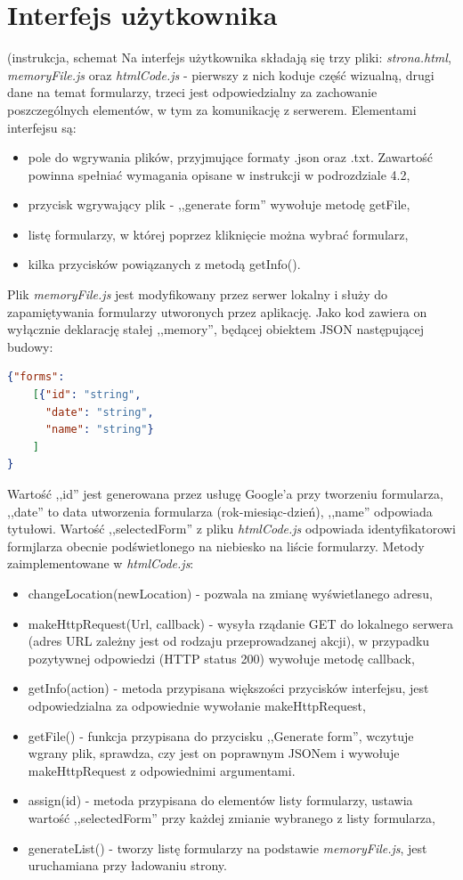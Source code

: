 \section{Interfejs użytkownika} (instrukcja, schemat
Na interfejs użytkownika składają się trzy pliki: \textit{strona.html}, \textit{memoryFile.js} oraz \textit{htmlCode.js} - pierwszy z nich koduje część wizualną, drugi dane na temat formularzy, trzeci jest odpowiedzialny za zachowanie poszczególnych elementów, w tym za komunikację z serwerem. 
\ind Elementami interfejsu są:
\begin{itemize}
\item pole do wgrywania plików, przyjmujące formaty .json oraz .txt. Zawartość powinna spełniać wymagania opisane w instrukcji w podrozdziale 4.2, %
\item przycisk wgrywający plik - ,,generate form'' wywołuje metodę getFile,
\item listę formularzy, w której poprzez kliknięcie można wybrać formularz,
\item kilka przycisków powiązanych z metodą getInfo().
\end{itemize}
\ind Plik \textit{memoryFile.js} jest modyfikowany przez serwer lokalny i służy do zapamiętywania formularzy utworonych przez aplikację. Jako kod zawiera on wyłącznie deklarację stałej ,,memory'', będącej obiektem JSON następującej budowy:
\begin{lstlisting}[language=json,firstnumber=1]
{"forms":
    [{"id": "string",
      "date": "string",
      "name": "string"}
    ]
}
\end{lstlisting}
Wartość ,,id'' jest generowana przez usługę Google'a przy tworzeniu formularza, ,,date'' to data utworzenia formularza (rok-miesiąc-dzień), ,,name'' odpowiada tytułowi.
\ind Wartość ,,selectedForm'' z pliku \textit{htmlCode.js} odpowiada identyfikatorowi formjlarza obecnie podświetlonego na niebiesko na liście formularzy. Metody zaimplementowane w \textit{htmlCode.js}:
\begin{itemize}
\item changeLocation(newLocation) - pozwala na zmianę wyświetlanego adresu,
\item makeHttpRequest(Url, callback) - wysyła rządanie GET do lokalnego serwera (adres URL zależny jest od rodzaju przeprowadzanej akcji), w przypadku pozytywnej odpowiedzi (HTTP status 200) wywołuje metodę callback,
\item getInfo(action) - metoda przypisana większości przycisków interfejsu, jest odpowiedzialna za odpowiednie wywołanie makeHttpRequest,
\item getFile() - funkcja przypisana do przycisku ,,Generate form'', wczytuje wgrany plik, sprawdza, czy jest on poprawnym JSONem i wywołuje makeHttpRequest z odpowiednimi argumentami.
\item assign(id) - metoda przypisana do elementów listy formularzy, ustawia wartość ,,selectedForm'' przy każdej zmianie wybranego z listy formularza,
\item generateList() - tworzy listę formularzy na podstawie \textit{memoryFile.js}, jest uruchamiana przy ładowaniu strony.
\end{itemize}


